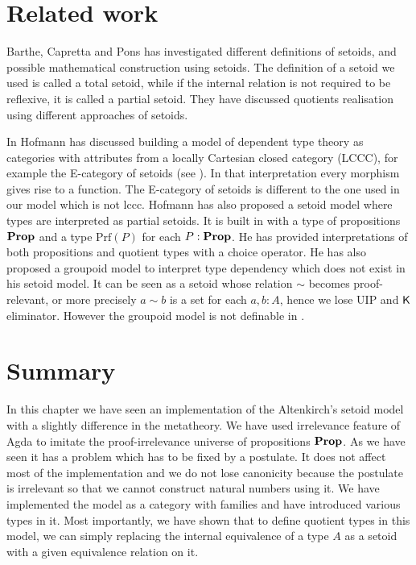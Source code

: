 \section{Related work}


Barthe, Capretta and Pons \cite{bar:03} has investigated different definitions of setoids, and possible mathematical construction using setoids. The definition of a setoid we used is called a total setoid, while if the internal relation is not required to be reflexive, it is called a partial setoid.
They have discussed quotients realisation using different approaches of setoids.

In \cite{hofmann1994interpretation} Hofmann has discussed building a model of dependent type theory as categories with attributes from a locally Cartesian closed category (LCCC), for example the E-category of setoids (see ). In that interpretation every morphism gives rise to a function. The E-category of setoids is different to the one used in our model which is not lccc. 
Hofmann \cite{hof:phd,hof:95:sm} has also proposed a setoid model where types are interpreted as partial setoids. It is built in \itt with a type of propositions $\operatorname{\mathbf{Prop}}$ and a type $\text{Prf}(P)$ for each $P : \operatorname{\mathbf{Prop}}$. He has provided interpretations of both propositions and quotient types with a choice operator.
He has also proposed a groupoid model \cite{hof:phd,MR1686862} to interpret type dependency which does not exist in his setoid model. It can be seen as a setoid whose relation $\sim$ becomes proof-relevant, or more precisely $a \sim b$ is a set for each $a, b : A$, hence we lose UIP and $\operatorname{\mathsf{K}}$ eliminator. However the groupoid model is not definable in \itt.



\section{Summary}

In this chapter we have seen an implementation of the Altenkirch's setoid model with a slightly difference in the metatheory. We have used irrelevance feature of Agda to imitate the proof-irrelevance universe of propositions $\operatorname{\mathbf{Prop}}$. As we have seen it has a problem which has to be fixed by a postulate. It does not affect most of the implementation and we do not lose canonicity because the postulate is irrelevant so that we cannot construct natural numbers using it. We have implemented the model as a category with families and have introduced various types in it. Most importantly, we have shown that to define quotient types in this model, we can simply replacing the internal equivalence of a type $A$ as a setoid with a given equivalence relation on it. 


